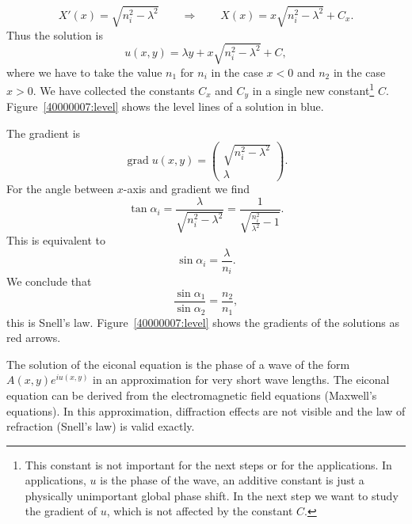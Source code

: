 \begin{loesung}
\begin{teilaufgaben}
\[
X'(x)=\sqrt{n_i^2-\lambda^2}
\qquad
\Rightarrow
\qquad
X(x)=x\sqrt{n_i^2-\lambda^2} + C_x.
\]
Thus the solution is
\[
u(x,y)=\lambda y + x\sqrt{n_i^2-\lambda^2} + C,
\]
where we have to take the value $n_1$ for $n_i$ in the case $x<0$
and $n_2$ in the case $x>0$.
We have collected the constants
$C_x$ and $C_y$ in a single new constant\footnote{This constant
is not important for the next steps or for the applications.
In applications, $u$ is the phase of the wave, an additive constant
is just a physically unimportant global phase shift.
In the next step we want to study the gradient of $u$, which is not
affected by the constant $C$.}
$C$.
Figure~\ref{40000007:level} shows the level lines of a solution in blue.
\item
The gradient is
\[
\operatorname{grad}u(x,y)
=
\begin{pmatrix}
\sqrt{n_i^2-\lambda^2}\\
\lambda
\end{pmatrix}.
\]
For the angle between $x$-axis and gradient we find
\[
\tan\alpha_i
=
\frac{\lambda}{\sqrt{n_i^2-\lambda^2}}
=
\frac1{\sqrt{\frac{n_i^2}{\lambda^2}-1}}.
\]
This is equivalent to
\[
\sin\alpha_i=\frac{\lambda}{n_i}.
\]
We conclude that
\[
\frac{ \sin\alpha_1}{\sin\alpha_2}=\frac{n_2}{n_1},
\]
this is Snell's law.
Figure~\ref{40000007:level} shows the gradients of the solutions
as red arrows.
\qedhere
\end{teilaufgaben}
\end{loesung}

\begin{diskussion}
The solution of the eiconal equation is the phase of a wave of the
form
$A(x,y)e^{iu(x,y)}$ in an approximation for very short wave lengths.
The eiconal equation can be derived from the electromagnetic field
equations (Maxwell's equations).
In this approximation, diffraction effects are not visible and the
law of refraction (Snell's law) is valid exactly.
\end{diskussion}
